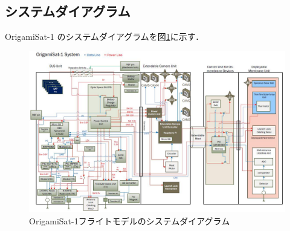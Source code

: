 \subsection{システムダイアグラム}
OrigamiSat-1 のシステムダイアグラムを図\ref{2-3-3}に示す．
\begin{figure}[H]
	\centering
	\includegraphics[width=1.0\textwidth]{02/fig/2-3-3.jpg}
	\caption{OrigamiSat-1フライトモデルのシステムダイアグラム}
	\label{2-3-3}
\end{figure}